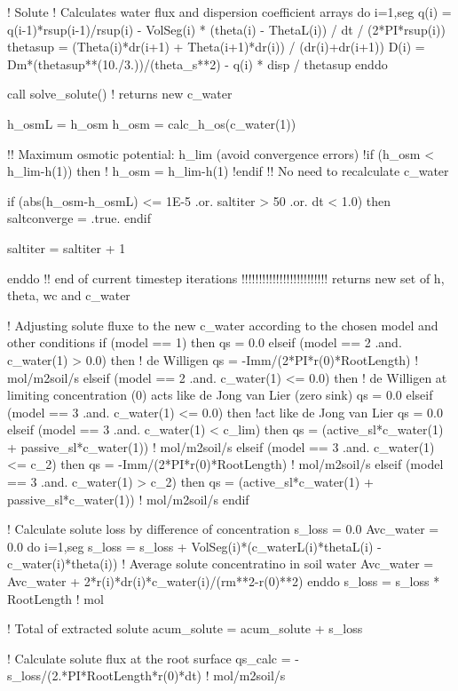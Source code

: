     ! Solute
    ! Calculates water flux and dispersion coefficient arrays
    do i=1,seg
      q(i) = q(i-1)*rsup(i-1)/rsup(i) - VolSeg(i) * (theta(i) - ThetaL(i)) / dt / (2*PI*rsup(i))
      thetasup = (Theta(i)*dr(i+1) + Theta(i+1)*dr(i)) / (dr(i)+dr(i+1))
      D(i) = Dm*(thetasup**(10./3.))/(theta_s**2) - q(i) * disp / thetasup
    enddo

    call solve_solute()   ! returns new c_water

 
    h_osmL = h_osm
    h_osm = calc_h_os(c_water(1))
    
    !! Maximum osmotic potential: h_lim (avoid convergence errors)
    !if (h_osm < h_lim-h(1)) then
    !  h_osm = h_lim-h(1)
    !endif
    !! No need to recalculate c_water

    if (abs(h_osm-h_osmL) <= 1E-5 .or. saltiter > 50 .or. dt < 1.0) then
      saltconverge = .true.
    endif

    saltiter = saltiter + 1

        
  enddo  !! end of current timestep iterations  !!!!!!!!!!!!!!!!!!!!!!!!! returns new set of h, theta, wc and c_water
  
  ! Adjusting solute fluxe to the new c_water according to the chosen model and other conditions
  if (model == 1) then
    qs = 0.0
  elseif (model == 2 .and. c_water(1) > 0.0) then	! de Willigen
    qs = -Imm/(2*PI*r(0)*RootLength)			! mol/m2soil/s
  elseif (model == 2 .and. c_water(1) <= 0.0) then	! de Willigen at limiting concentration (0) acts like de Jong van Lier (zero sink)
    qs = 0.0
  elseif (model == 3 .and. c_water(1) <= 0.0) then 	!act like de Jong van Lier
    qs = 0.0
  elseif (model == 3 .and. c_water(1) < c_lim) then
    qs = (active_sl*c_water(1) + passive_sl*c_water(1)) ! mol/m2soil/s
  elseif (model == 3 .and. c_water(1) <= c_2) then
    qs = -Imm/(2*PI*r(0)*RootLength)			! mol/m2soil/s
  elseif (model == 3 .and. c_water(1) > c_2) then 
    qs = (active_sl*c_water(1) + passive_sl*c_water(1)) ! mol/m2soil/s
  endif 

  ! Calculate solute loss by difference of concentration
  s_loss = 0.0
  Avc_water = 0.0
  do i=1,seg
    s_loss = s_loss + VolSeg(i)*(c_waterL(i)*thetaL(i) - c_water(i)*theta(i))
    ! Average solute concentratino in soil water
    Avc_water = Avc_water + 2*r(i)*dr(i)*c_water(i)/(rm**2-r(0)**2)
  enddo
  s_loss = s_loss * RootLength	! mol
  
  ! Total of extracted solute
  acum_solute = acum_solute + s_loss

  ! Calculate solute flux at the root surface
  qs_calc = -s_loss/(2.*PI*RootLength*r(0)*dt)		! mol/m2soil/s

